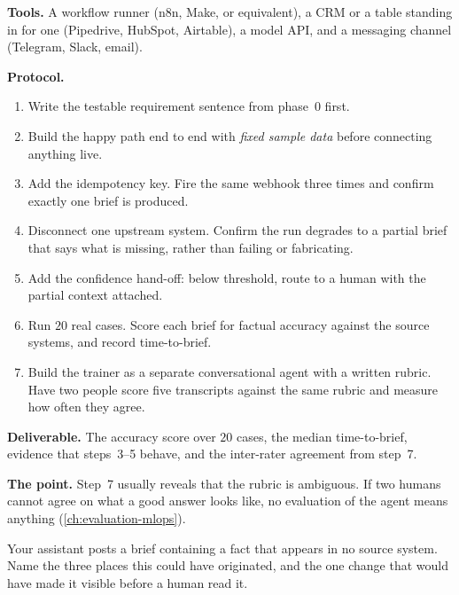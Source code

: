 \begin{practicallab}
\textbf{Tools.} A workflow runner (n8n, Make, or equivalent), a CRM or a table
standing in for one (Pipedrive, HubSpot, Airtable), a model API, and a
messaging channel (Telegram, Slack, email).

\textbf{Protocol.}
\begin{enumerate}
  \item Write the testable requirement sentence from phase~0 first.
  \item Build the happy path end to end with \emph{fixed sample data} before
        connecting anything live.
  \item Add the idempotency key. Fire the same webhook three times and confirm
        exactly one brief is produced.
  \item Disconnect one upstream system. Confirm the run degrades to a partial
        brief that says what is missing, rather than failing or fabricating.
  \item Add the confidence hand-off: below threshold, route to a human with
        the partial context attached.
  \item Run $20$ real cases. Score each brief for factual accuracy against the
        source systems, and record time-to-brief.
  \item Build the trainer as a separate conversational agent with a written
        rubric. Have two people score five transcripts against the same rubric
        and measure how often they agree.
\end{enumerate}

\textbf{Deliverable.} The accuracy score over $20$ cases, the median
time-to-brief, evidence that steps~3--5 behave, and the inter-rater agreement
from step~7.

\textbf{The point.} Step~7 usually reveals that the rubric is ambiguous. If two
humans cannot agree on what a good answer looks like, no evaluation of the
agent means anything (\cref{ch:evaluation-mlops}).
\end{practicallab}

\begin{checkpoint}
Your assistant posts a brief containing a fact that appears in no source
system. Name the three places this could have originated, and the one change
that would have made it visible before a human read it.
\end{checkpoint}


